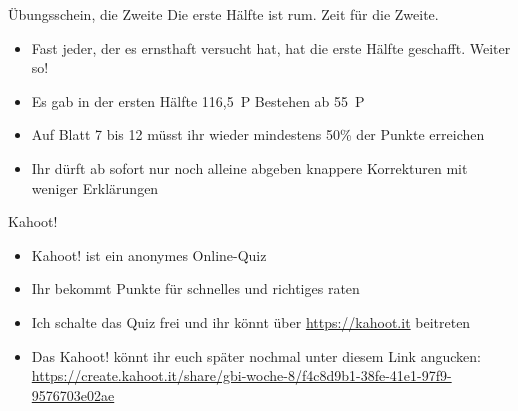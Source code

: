 \begin{frame}{Übungsschein, die Zweite}
	Die erste Hälfte ist rum. Zeit für die Zweite.
	\begin{itemize}[<+->]
		\item Fast jeder, der es ernsthaft versucht hat, hat die erste Hälfte geschafft. Weiter so!
		\item Es gab in der ersten Hälfte 116,5~P \impl Bestehen ab 55~P
		\item Auf Blatt 7 bis 12 müsst ihr wieder mindestens 50\% der Punkte erreichen
		\item Ihr dürft ab sofort nur noch alleine abgeben
		\implitem knappere Korrekturen mit weniger Erklärungen
	\end{itemize}
\end{frame}


\framePrevEpisode

\begin{frame}{Kahoot!}
	\begin{itemize}[<+->]
		\item Kahoot! ist ein anonymes Online-Quiz
		\item Ihr bekommt Punkte für schnelles und richtiges raten
		\item Ich schalte das Quiz frei und ihr könnt über \url{https://kahoot.it} beitreten
		\item Das Kahoot! könnt ihr euch später nochmal unter diesem Link angucken: \\
			\url{https://create.kahoot.it/share/gbi-woche-8/f4c8d9b1-38fe-41e1-97f9-9576703e02ae}
	\end{itemize}
\end{frame}


